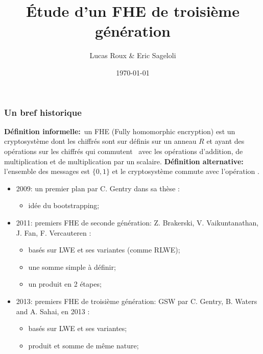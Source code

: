 \documentclass[10pt,xcolor={usenames,dvipsnames}]{beamer}
\title{\'Etude d'un FHE de troisième génération}
\date{\today}
\author{Lucas Roux \& Eric Sageloli}
\begin{document}
 \begin{frame} 
 \maketitle
 \end{frame}


 \begin{frame} 
 \tableofcontents
 \end{frame}


 \begin{frame} 
 \frametitle{Un bref historique}
\textbf{Définition informelle:} un FHE (Fully homomorphic encryption) est un cryptosystème dont les chiffrés 
 sont sur définis sur un anneau $R$ et ayant des opérations sur les chiffrés qui 
 \og commutent \fg~avec les opérations 
 d'addition, de multiplication et de multiplication par un scalaire. 
\textbf{Définition alternative:} l'ensemble des messages est $\{0,1\}$ et le cryptosystème commute  
avec l'opération .
\pause
\begin{itemize}
\item 2009: un premier plan par C. Gentry dans sa thèse :
\begin{itemize}
\item idée du bootstrapping;
\end{itemize}
\item 2011: premiers FHE de seconde génération: Z. Brakerski,  V. \nolinebreak Vaikuntanathan, J. Fan, F. Vercauteren :
	\begin{itemize}
	\item basés sur LWE et ses variantes (comme RLWE);
	\item une somme simple à définir;
	\item un produit en 2 étapes;
	\end{itemize}
\item 2013: premiers FHE de troisième génération: GSW par C. Gentry, B. Waters and A. Sahai, en 2013 :
	\begin{itemize}
	\item basés sur LWE et ses variantes;
	\item produit et somme de même nature;
	\end{itemize}
\end{itemize}
\end{frame} 
\end{document}
